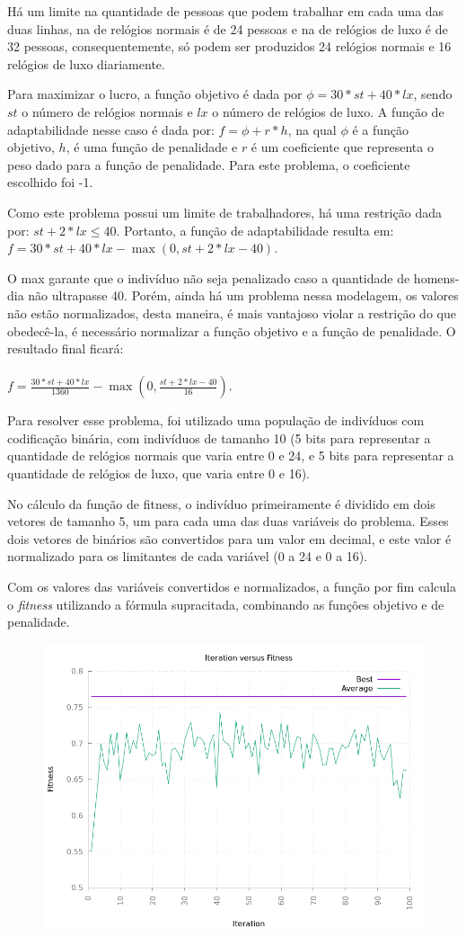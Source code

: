\documentclass[12pt]{article}
\begin{document}
Há um limite na quantidade de pessoas que podem trabalhar em cada uma das duas linhas, na de relógios 
normais é de 24 pessoas e na de relógios de luxo é de 32 pessoas, consequentemente, só podem ser 
produzidos 24 relógios normais e 16 relógios de luxo diariamente.

Para maximizar o lucro, a função objetivo é dada por $\phi = 30 * st + 40 * lx$, sendo $st$ o número 
de relógios normais e $lx$ o número de relógios de luxo. A função de adaptabilidade nesse caso é dada 
por: $f = \phi + r * h$, na qual $\phi$ é a função objetivo, $h$, é uma função de penalidade e $r$ é 
um coeficiente que representa o peso dado para a função de penalidade. Para este problema, o coeficiente 
escolhido foi -1.

Como este problema possui um limite de trabalhadores, há uma restrição dada por: $st + 2 * lx \leq 40$. 
Portanto, a função de adaptabilidade resulta em: \\ $f = 30 * st + 40 * lx - \max(0,st + 2 * lx - 40)$.

O max garante que o indivíduo não seja penalizado caso a quantidade de homens-dia não ultrapasse 40. 
Porém, ainda há um problema nessa modelagem, os valores não estão normalizados, desta maneira, é mais 
vantajoso violar a restrição do que obedecê-la, é necessário normalizar a função objetivo e a 
função de penalidade. O resultado final ficará: \\ \\ $f = \frac{30 * st + 40 * lx}{1360} - 
\max(0,\frac{st + 2 * lx - 40}{16})$.

Para resolver esse problema, foi utilizado uma população de indivíduos com codificação binária, com 
indivíduos de tamanho 10 (5 bits para representar a quantidade de relógios normais que varia entre 0 
e 24, e 5 bits para representar a quantidade de relógios de luxo, que varia entre 0 e 16).

No cálculo da função de fitness, o indivíduo primeiramente é dividido em dois vetores de tamanho 5, 
um para cada uma das duas variáveis do problema. Esses dois vetores de binários são convertidos para 
um valor em decimal, e este valor é normalizado para os limitantes de cada variável (0 a 24 e 0 a 16).

Com os valores das variáveis convertidos e normalizados, a função por fim calcula o \textit{fitness}
utilizando a fórmula supracitada, combinando as funções objetivo e de penalidade.

\begin{figure}[h!]
    \centering
    \includegraphics[width=.5\textwidth]{pictures/radio-factory}
\end{figure}
\end{document}
